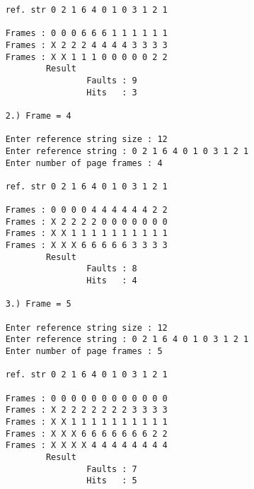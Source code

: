 \documentclass{article}
\begin{document}
\begin{enumerate}
{\begin{verbatim}
    ref. str 0 2 1 6 4 0 1 0 3 1 2 1
    
    Frames : 0 0 0 6 6 6 1 1 1 1 1 1
    Frames : X 2 2 2 4 4 4 4 3 3 3 3
    Frames : X X 1 1 1 0 0 0 0 0 2 2
            Result
                    Faults : 9
                    Hits   : 3

    2.) Frame = 4

    Enter reference string size : 12
    Enter reference string : 0 2 1 6 4 0 1 0 3 1 2 1
    Enter number of page frames : 4
    
    ref. str 0 2 1 6 4 0 1 0 3 1 2 1 
    
    Frames : 0 0 0 0 4 4 4 4 4 4 2 2
    Frames : X 2 2 2 2 0 0 0 0 0 0 0
    Frames : X X 1 1 1 1 1 1 1 1 1 1
    Frames : X X X 6 6 6 6 6 3 3 3 3
            Result
                    Faults : 8
                    Hits   : 4   
    
    3.) Frame = 5

    Enter reference string size : 12 
    Enter reference string : 0 2 1 6 4 0 1 0 3 1 2 1
    Enter number of page frames : 5
    
    ref. str 0 2 1 6 4 0 1 0 3 1 2 1
    
    Frames : 0 0 0 0 0 0 0 0 0 0 0 0
    Frames : X 2 2 2 2 2 2 2 3 3 3 3
    Frames : X X 1 1 1 1 1 1 1 1 1 1 
    Frames : X X X 6 6 6 6 6 6 6 2 2
    Frames : X X X X 4 4 4 4 4 4 4 4
            Result
                    Faults : 7
                    Hits   : 5   

\end{verbatim}
}

\end{enumerate}
\end{document}
